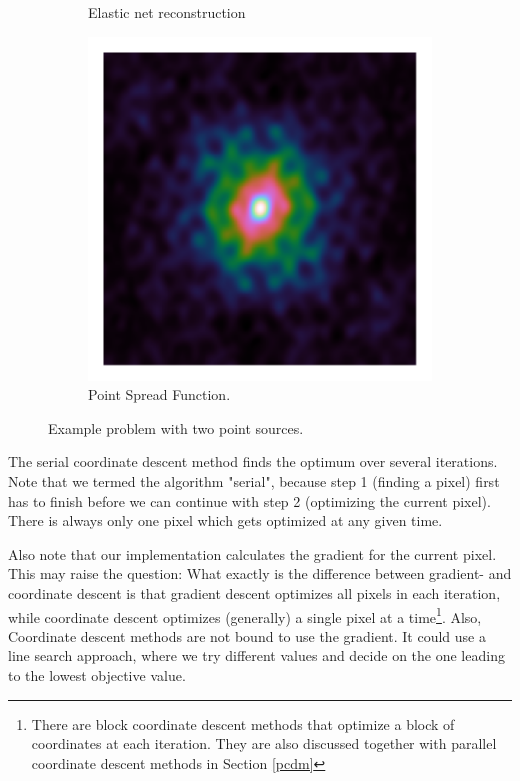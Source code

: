 \begin{figure}[h]
\begin{subfigure}[b]{0.3\linewidth}
		\caption{Elastic net reconstruction}
		\label{cd:serial:aid:elastic}
	\end{subfigure}
	\begin{subfigure}[b]{0.3\linewidth}
		\includegraphics[width=\linewidth, clip, trim= 0.125in 0.125in 0.125in 0.125in]{./chapters/03.cd/simulated/psf.png}
		\caption{Point Spread Function.}
		\label{cd:serial:aid:psf}
	\end{subfigure}

	\caption{Example problem with two point sources.}
	\label{cd:serial:aid:figure}
\end{figure}

The serial coordinate descent method finds the optimum over several iterations. Note that we termed the algorithm "serial", because step 1 (finding a pixel) first has to finish before we can continue with step 2 (optimizing the current pixel). There is always only one pixel which gets optimized at any given time.

Also note that our implementation calculates the gradient for the current pixel. This may raise the question: What exactly is the difference between gradient- and coordinate descent is that gradient descent optimizes all pixels in each iteration, while coordinate descent optimizes (generally) a single pixel at a time\footnote{There are block coordinate descent methods that optimize a block of coordinates at each iteration. They are also discussed together with parallel coordinate descent methods in Section \ref{pcdm}}. Also, Coordinate descent methods are not bound to use the gradient. It could use a line search approach, where we try different values and decide on the one leading to the lowest objective value.

